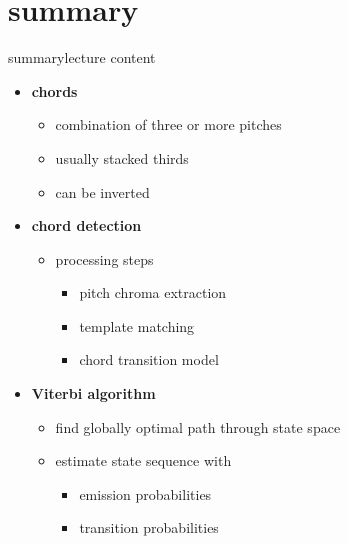     \section{summary}
        \begin{frame}{summary}{lecture content}
            \begin{itemize}
                \item   \textbf{chords}
                    \begin{itemize}
                        \item   combination of three or more pitches
                        \item   usually stacked thirds
                        \item   can be inverted
                    \end{itemize}
                \smallskip
                \item   \textbf{chord detection}
                    \begin{itemize}
                        \item   processing steps
                            \begin{itemize}
                                \item   pitch chroma extraction
                                \item   template matching
                                \item   chord transition model
                            \end{itemize}
                    \end{itemize}
                \smallskip
                \item   \textbf{Viterbi algorithm}
                    \begin{itemize}
                        \item   find globally optimal path through state space
                        \item   estimate state sequence with
                            \begin{itemize}
                                \item   emission probabilities 
                                \item   transition probabilities
                            \end{itemize}
                    \end{itemize}
            \end{itemize}
        \end{frame}

